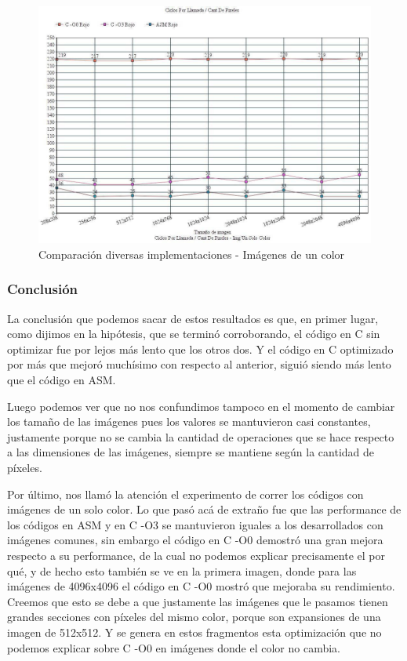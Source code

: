 \begin{figure}[h!]
\centering
\captionsetup{justification=centering}
	\includegraphics[width = 15 cm, height = 8 cm]{imagenes/mismoColor.jpg}
	\caption[center]{Comparación diversas implementaciones - Imágenes de un color}
\end{figure}

\subsubsection{Conclusión}
\par{La conclusión que podemos sacar de estos resultados es que, en primer lugar, como dijimos en la hipótesis, que se terminó corroborando, el código en C sin optimizar fue por lejos más lento que los otros dos. Y el código en C optimizado por más que mejoró muchísimo con respecto al anterior, siguió siendo más lento que el código en ASM.}
\par{Luego podemos ver que no nos confundimos tampoco en el momento de cambiar los tamaño de las imágenes pues los valores se mantuvieron casi constantes, justamente porque no se cambia la cantidad de operaciones que se hace respecto a las dimensiones de las imágenes, siempre se mantiene según la cantidad de píxeles.}
\par{Por último, nos llamó la atención el experimento de correr los códigos con imágenes de un solo color. Lo que pasó acá de extraño fue que las performance de los códigos en ASM y en C -O3 se mantuvieron iguales a los desarrollados con imágenes comunes, sin embargo el código en C -O0 demostró una gran mejora respecto a su performance, de la cual no podemos explicar precisamente el por qué, y de hecho esto también se ve en la primera imagen, donde para las imágenes de 4096x4096 el código en C -O0 mostró que mejoraba su rendimiento. Creemos que esto se debe a que justamente las imágenes que le pasamos tienen grandes secciones con píxeles del mismo color, porque son expansiones de una imagen de 512x512. Y se genera en estos fragmentos esta optimización que no podemos explicar sobre C -O0 en imágenes donde el color no cambia.}
	

